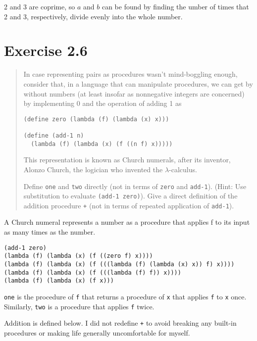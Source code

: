 \documentclass{article}
\begin{document}
2 and 3 are coprime, so $a$ and $b$ can be found by finding the umber of times
that 2 and 3, respectively, divide evenly into the whole number.


\section{Exercise 2.6}
\begin{quote}
    In case representing pairs as procedures wasn't mind-boggling enough,
    consider that, in a language that can manipulate procedures, we can get by
    without numbers (at least insofar as nonnegative integers are concerned) by
    implementing 0 and the operation of adding 1 as
    \begin{lstlisting}
(define zero (lambda (f) (lambda (x) x)))

(define (add-1 n)
  (lambda (f) (lambda (x) (f ((n f) x)))))
    \end{lstlisting}
    This representation is known as Church numerals, after its inventor, Alonzo
    Church, the logician who invented the $\lambda$-calculus.

    Define \texttt{one} and \texttt{two} directly (not in terms of
    \texttt{zero} and \texttt{add-1}). (Hint: Use substitution to evaluate
    \texttt{(add-1 zero)}). Give a direct definition of the addition procedure
    \texttt{+} (not in terms of repeated application of \texttt{add-1}).
\end{quote}

A Church numeral represents a number as a procedure that applies f to its input
as many times as the number.
\begin{lstlisting}
(add-1 zero)
(lambda (f) (lambda (x) (f ((zero f) x))))
(lambda (f) (lambda (x) (f (((lambda (f) (lambda (x) x)) f) x))))
(lambda (f) (lambda (x) (f (((lambda (f) f)) x))))
(lambda (f) (lambda (x) (f x)))
\end{lstlisting}
\texttt{one} is the procedure of \texttt{f} that returns a procedure of
\texttt{x} that applies \texttt{f} to \texttt{x} once. Similarly, \texttt{two}
is a procedure that applies \texttt{f} twice.


Addition is defined below. I did not redefine \texttt{+} to avoid breaking any
built-in procedures or making life generally uncomfortable for myself.

\end{document}
